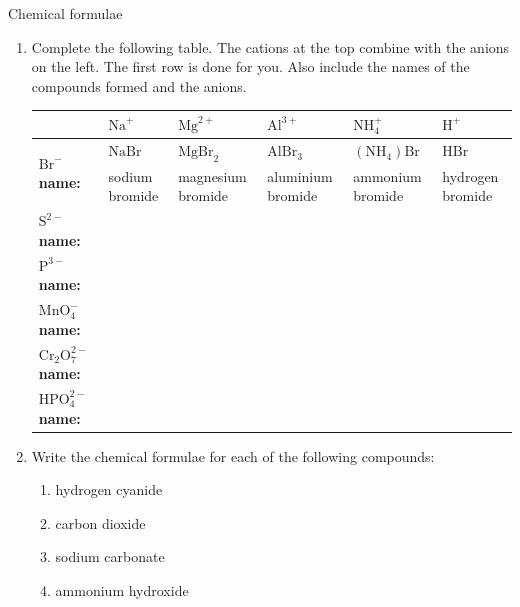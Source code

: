             \begin{exercises}{Chemical formulae
        }
            \nopagebreak
        \label{m38689*id145052}\begin{enumerate}[noitemsep, label=\textbf{\arabic*}. ] 
            \label{m38689*uid100}\item 
Complete the following table. The cations at the top combine with the anions on the left. The first row is done for you. Also include the names of the compounds formed and the anions.
          \begin{table}[H]
        \begin{center}
      \label{m38689*id145067}
    \noindent
      \begin{tabular}{|p{1cm}|p{1.5cm}|p{2cm}|p{2cm}|p{2cm}|p{2cm}|}\hline
        &\textbf{ $\text{Na}^{+}$} & \textbf{$\text{Mg}^{2+}$} & \textbf{$\text{Al}^{3+}$} & \textbf{$\text{NH}_{4}^{+}$} & \textbf{$\text{H}^{+}$} \\ \hline
\multirow{2}{1cm}{\textbf{$\text{Br}^{-}$ name:}} & $\text{NaBr}$  & $\text{MgBr}_2$  & $\text{AlBr}_3$  & $(\text{NH}_{4})\text{Br}$  & $\mathrm{HBr}$  \\ 
 & sodium bromide & magnesium bromide & aluminium bromide & ammonium bromide & hydrogen bromide \\ \hline
\textbf{$\text{S}^{2-}$ name:} & & & & & \\ \hline
\textbf{$\text{P}^{3-}$ name:} & & & & & \\ \hline
\textbf{$\text{MnO}_{4}^{-}$ name:} & & & & & \\ \hline
\textbf{$\text{Cr}_{2}\text{O}_{7}^{2-}$ name:} & & & & & \\ \hline
\textbf{$\text{HPO}_{4}^{2-}$ name:} & & & & & \\ \hline
    \end{tabular}
      \end{center}
\end{table}
    \par
          \label{m38689*uid101}\item Write the chemical formulae for each of the following compounds:
\label{m38689*id145444}\begin{enumerate}[noitemsep, label=\textbf{\alph*}. ] 
            \label{m38689*uid102}\item hydrogen cyanide
\label{m38689*uid103}\item carbon dioxide
\label{m38689*uid104}\item sodium carbonate
\label{m38689*uid105}\item ammonium hydroxide

\end{enumerate}
\end{enumerate}
\end{exercises}

